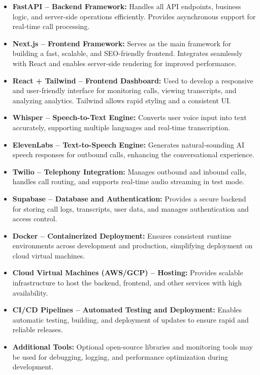 \documentclass[12pt,a4paper]{report}
\begin{document}
\begin{itemize}
    \item \textbf{FastAPI – Backend Framework:} Handles all API endpoints, business logic, and server-side operations efficiently. Provides asynchronous support for real-time call processing.
    
    \item \textbf{Next.js – Frontend Framework:} Serves as the main framework for building a fast, scalable, and SEO-friendly frontend. Integrates seamlessly with React and enables server-side rendering for improved performance.
    
    \item \textbf{React + Tailwind – Frontend Dashboard:} Used to develop a responsive and user-friendly interface for monitoring calls, viewing transcripts, and analyzing analytics. Tailwind allows rapid styling and a consistent UI.
    
    \item \textbf{Whisper – Speech-to-Text Engine:} Converts user voice input into text accurately, supporting multiple languages and real-time transcription.
    
    \item \textbf{ElevenLabs – Text-to-Speech Engine:} Generates natural-sounding AI speech responses for outbound calls, enhancing the conversational experience.
    
    \item \textbf{Twilio – Telephony Integration:} Manages outbound and inbound calls, handles call routing, and supports real-time audio streaming in test mode.
    
    \item \textbf{Supabase – Database and Authentication:} Provides a secure backend for storing call logs, transcripts, user data, and manages authentication and access control.
    
    \item \textbf{Docker – Containerized Deployment:} Ensures consistent runtime environments across development and production, simplifying deployment on cloud virtual machines.
    
    \item \textbf{Cloud Virtual Machines (AWS/GCP) – Hosting:} Provides scalable infrastructure to host the backend, frontend, and other services with high availability.
    
    \item \textbf{CI/CD Pipelines – Automated Testing and Deployment:} Enables automatic testing, building, and deployment of updates to ensure rapid and reliable releases.
    
    \item \textbf{Additional Tools:} Optional open-source libraries and monitoring tools may be used for debugging, logging, and performance optimization during development.
\end{itemize}
\end{document}
